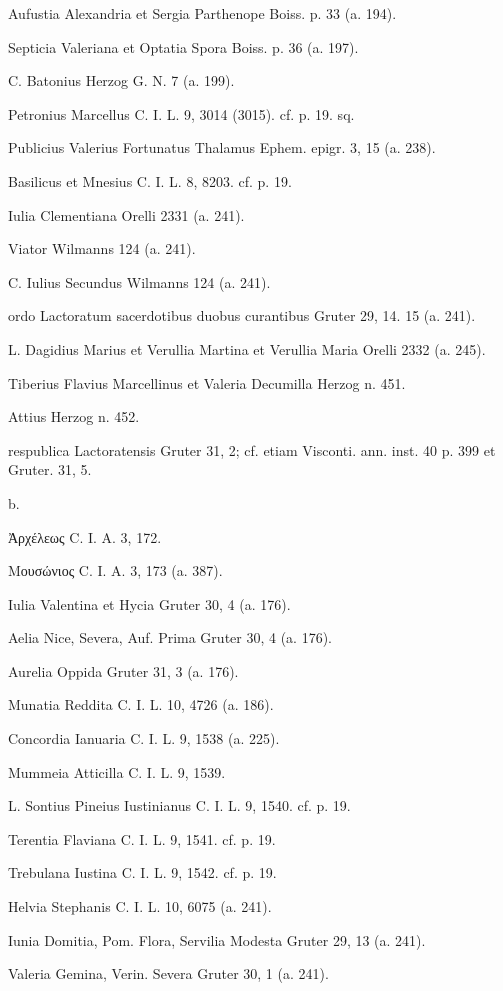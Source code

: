 \documentclass[a4paper, 11pt, oneside, polutonikogreek, german]{article}
\begin{document}
Aufustia Alexandria et Sergia Parthenope Boiss. p. 33 (a. 194).

Septicia Valeriana et Optatia Spora Boiss. p. 36 (a. 197).

C. Batonius Herzog G. N. 7 (a. 199).

Petronius Marcellus C. I. L. 9, 3014 (3015). cf. p. 19. sq.

Publicius Valerius Fortunatus Thalamus Ephem. epigr. 3, 15 (a. 238).

Basilicus et Mnesius C. I. L. 8, 8203. cf. p. 19.

Iulia Clementiana Orelli 2331 (a. 241).

Viator Wilmanns 124 (a. 241).

C. Iulius Secundus Wilmanns 124 (a. 241).

ordo Lactoratum sacerdotibus duobus curantibus Gruter 29, 14. 15 (a. 241).

L. Dagidius Marius et Verullia Martina et Verullia Maria Orelli 2332 (a. 245).

Tiberius Flavius Marcellinus et Valeria Decumilla Herzog n. 451.

Attius Herzog n. 452.

respublica Lactoratensis Gruter 31, 2; cf. etiam Visconti. ann. inst. 40 p. 399 et Gruter. 31, 5.

b.

Ἀρχέλεως C. I. A. 3, 172.

Μουσώνιος C. I. A. 3, 173 (a. 387).

Iulia Valentina et Hycia Gruter 30, 4 (a. 176).

Aelia Nice, Severa, Auf. Prima Gruter 30, 4 (a. 176).

Aurelia Oppida Gruter 31, 3 (a. 176).

Munatia Reddita C. I. L. 10, 4726 (a. 186).

Concordia Ianuaria C. I. L. 9, 1538 (a. 225).

Mummeia Atticilla C. I. L. 9, 1539.

L. Sontius Pineius Iustinianus C. I. L. 9, 1540. cf. p. 19.

Terentia Flaviana C. I. L. 9, 1541. cf. p. 19.

Trebulana Iustina C. I. L. 9, 1542. cf. p. 19.

Helvia Stephanis C. I. L. 10, 6075 (a. 241).

Iunia Domitia, Pom. Flora, Servilia Modesta Gruter 29, 13 (a. 241).

Valeria Gemina, Verin. Severa Gruter 30, 1 (a. 241).
\end{document}
